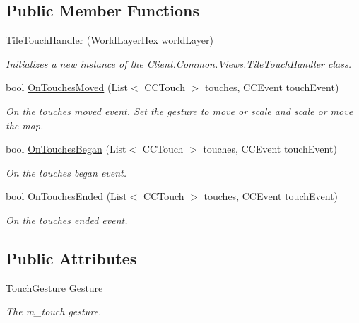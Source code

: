 \subsection*{Public Member Functions}
\begin{DoxyCompactItemize}
\item 
\hyperlink{classClient_1_1Common_1_1Views_1_1TileTouchHandler_a35c6d3c4e3fb5c5b2db8779697f42f4e}{Tile\+Touch\+Handler} (\hyperlink{classClient_1_1Common_1_1Views_1_1WorldLayerHex}{World\+Layer\+Hex} world\+Layer)
\begin{DoxyCompactList}\small\item\em Initializes a new instance of the \hyperlink{classClient_1_1Common_1_1Views_1_1TileTouchHandler}{Client.\+Common.\+Views.\+Tile\+Touch\+Handler} class. \end{DoxyCompactList}\item 
bool \hyperlink{classClient_1_1Common_1_1Views_1_1TileTouchHandler_a341619d37cbb543ed368d3f0a5dc5c07}{On\+Touches\+Moved} (List$<$ C\+C\+Touch $>$ touches, C\+C\+Event touch\+Event)
\begin{DoxyCompactList}\small\item\em On the touches moved event. Set the gesture to move or scale and scale or move the map. \end{DoxyCompactList}\item 
bool \hyperlink{classClient_1_1Common_1_1Views_1_1TileTouchHandler_aff4ae317d43b13aa93939d1e3c788210}{On\+Touches\+Began} (List$<$ C\+C\+Touch $>$ touches, C\+C\+Event touch\+Event)
\begin{DoxyCompactList}\small\item\em On the touches began event. \end{DoxyCompactList}\item 
bool \hyperlink{classClient_1_1Common_1_1Views_1_1TileTouchHandler_af3f147d2b21fef262ac8b2840cfe04c3}{On\+Touches\+Ended} (List$<$ C\+C\+Touch $>$ touches, C\+C\+Event touch\+Event)
\begin{DoxyCompactList}\small\item\em On the touches ended event. \end{DoxyCompactList}\end{DoxyCompactItemize}
\subsection*{Public Attributes}
\begin{DoxyCompactItemize}
\item 
\hyperlink{classClient_1_1Common_1_1Views_1_1TileTouchHandler_a623aafe142a2f68e0c4d969792eb0e76}{Touch\+Gesture} \hyperlink{classClient_1_1Common_1_1Views_1_1TileTouchHandler_a0eb77636fe12dc2fdc5d3aec4bcabc3b}{Gesture}
\begin{DoxyCompactList}\small\item\em The m\+\_\+touch gesture. \end{DoxyCompactList}\end{DoxyCompactItemize}



